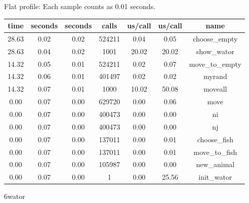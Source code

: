 \documentclass[a4paper,10pt]{article}
\begin{document}
Flat profile:
Each sample counts as 0.01 seconds.
\begin{center}
  \begin{tabular}{| c | c | c | c | c | c | c |}
    \hline
 time &   seconds &   seconds &    calls &  us/call &   us/call &   name \\ \hline    
 28.63 &      0.02 &     0.02 &   524211 &     0.04 &      0.05 &   choose\_empty \\ \hline
 28.63 &      0.04 &     0.02 &     1001 &    20.02 &     20.02 &   show\_wator \\ \hline
 14.32 &      0.05 &     0.01 &   524211 &     0.02 &      0.07 &   move\_to\_empty \\ \hline
 14.32 &      0.06 &     0.01 &   401497 &     0.02 &      0.02 &   myrand \\ \hline
 14.32 &      0.07 &     0.01 &     1000 &    10.02 &     50.08 &   moveall \\ \hline
  0.00 &      0.07 &     0.00 &   629720 &     0.00 &      0.06 &   move \\ \hline
  0.00 &      0.07 &     0.00 &   400473 &     0.00 &      0.00 &   ni \\ \hline
  0.00 &      0.07 &     0.00 &   400473 &     0.00 &      0.00 &   nj \\ \hline
  0.00 &      0.07 &     0.00 &   137011 &     0.00 &      0.01 &   choose\_fish \\ \hline
  0.00 &      0.07 &     0.00 &   137011 &     0.00 &      0.01 &   move\_to\_fish \\ \hline
  0.00 &      0.07 &     0.00 &   105987 &     0.00 &      0.00 &   new\_animal \\ \hline
  0.00 &      0.07 &     0.00 &        1 &     0.00 &     25.56 &   init\_wator \\ \hline
  \end{tabular}
\end{center}

6wator
\end{document}
